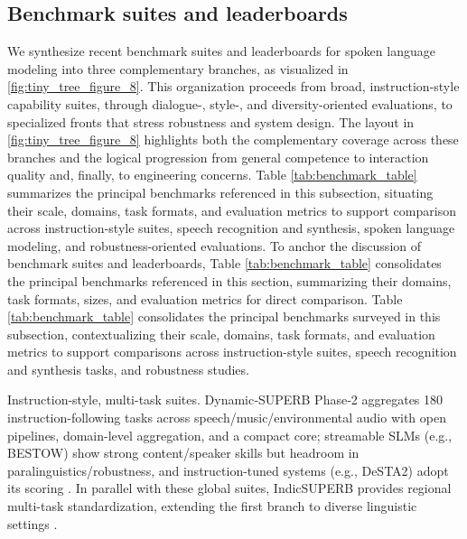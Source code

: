 \subsection{Benchmark suites and leaderboards} \label{subsec:Benchmark suites and leaderboards}







We synthesize recent benchmark suites and leaderboards for spoken language modeling into three complementary branches, as visualized in \autoref{fig:tiny_tree_figure_8}. This organization proceeds from broad, instruction-style capability suites, through dialogue-, style-, and diversity-oriented evaluations, to specialized fronts that stress robustness and system design. The layout in \autoref{fig:tiny_tree_figure_8} highlights both the complementary coverage across these branches and the logical progression from general competence to interaction quality and, finally, to engineering concerns. Table \ref{tab:benchmark_table} summarizes the principal benchmarks referenced in this subsection, situating their scale, domains, task formats, and evaluation metrics to support comparison across instruction-style suites, speech recognition and synthesis, spoken language modeling, and robustness-oriented evaluations. To anchor the discussion of benchmark suites and leaderboards, Table \ref{tab:benchmark_table} consolidates the principal benchmarks referenced in this section, summarizing their domains, task formats, sizes, and evaluation metrics for direct comparison. Table \ref{tab:benchmark_table} consolidates the principal benchmarks surveyed in this subsection, contextualizing their scale, domains, task formats, and evaluation metrics to support comparisons across instruction-style suites, speech recognition and synthesis tasks, and robustness studies.

Instruction-style, multi-task suites. Dynamic‑SUPERB Phase‑2 aggregates 180 instruction-following tasks across speech/music/environmental audio with open pipelines, domain-level aggregation, and a compact core; streamable SLMs (e.g., BESTOW) show strong content/speaker skills but headroom in paralinguistics/robustness, and instruction-tuned systems (e.g., DeSTA2) adopt its scoring \cite{huang2025dynamicsuperbphase2collaborativelyexpand,chen2024bestowefficientstreamablespeechlanguagem,lu2025desta2developinginstructionfollowingspee}. In parallel with these global suites, IndicSUPERB provides regional multi-task standardization, extending the first branch to diverse linguistic settings \cite{entry2025indicsuperbspeechprocessinguniversalperf}.

